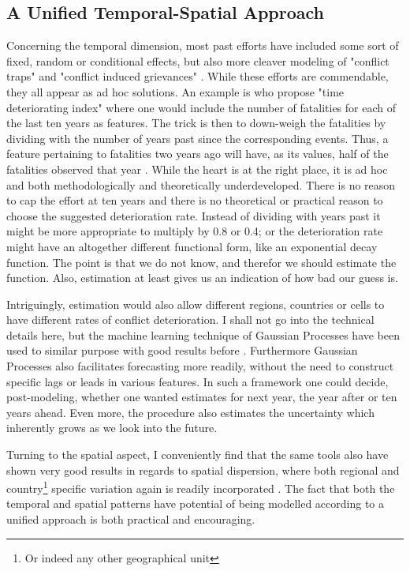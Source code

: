 \documentclass[a4paper]{article}
\begin{document}
\subsection{A Unified Temporal-Spatial Approach}

Concerning the temporal dimension, most past efforts have included some sort of fixed, random or conditional effects, but also more cleaver modeling of "conflict traps" and "conflict induced grievances" \citep{Collier_Hoeffler_2004, Hegre_Sambanis_2006, Cederman_Gleditsch_Buhaug_2013, perry_2013}. While these efforts are commendable, they all appear as ad hoc solutions. An example is \cite{perry_2013} who propose "time deteriorating index" where one would include the number of fatalities for each of the last ten years as features. The trick is then to down-weigh the fatalities by dividing with the number of years past since the corresponding events. Thus, a feature pertaining to fatalities two years ago will have, as its values, half of the fatalities observed that year \cite[14]{perry_2013}. While the heart is at the right place, it is ad hoc and both methodologically and theoretically underdeveloped. There is no reason to cap the effort at ten years and there is no theoretical or practical reason to choose the suggested deterioration rate. Instead of dividing with years past it might be more appropriate to multiply by 0.8 or 0.4; or the deterioration rate might have an altogether different functional form, like an exponential decay function. The point is that we do not know, and therefor we should estimate the function. Also, estimation at least gives us an indication of how bad our guess is.\par 

Intriguingly, estimation would also allow different regions, countries or cells to have different rates of conflict deterioration. I shall not go into the technical details here, but the machine learning technique of Gaussian Processes have been used to similar purpose with good results before \citep{Gelman_2013, Mcelreath_2018}. Furthermore Gaussian Processes also facilitates forecasting more readily, without the need to construct specific lags or leads in various features. In such a framework one could decide, post-modeling, whether one wanted estimates for next year, the year after or ten years ahead. Even more, the procedure also estimates the uncertainty which inherently grows as we look into the future.\par
 
Turning to the spatial aspect, I conveniently find that the same tools also have shown very good results in regards to spatial dispersion, where both regional and country\footnote{Or indeed any other geographical unit} specific variation again is readily incorporated \citep{gelfand2003spatial, gelfand2012hierarchical, gelfand2016spatial}. The fact that both the temporal and spatial patterns have potential of being modelled according to a unified approach is both practical and encouraging.\par
\end{document}
